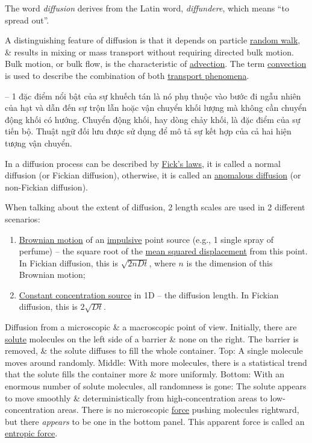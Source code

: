 \documentclass{article}
\begin{document}
The word {\it diffusion} derives from the Latin word, {\it diffundere}, which means ``to spread out''.

A distinguishing feature of diffusion is that it depends on particle \href{https://en.wikipedia.org/wiki/Random_walk}{random walk}, \& results in mixing or mass transport without requiring directed bulk motion. Bulk motion, or bulk flow, is the characteristic of \href{https://en.wikipedia.org/wiki/Advection}{advection}. The term \href{https://en.wikipedia.org/wiki/Convection}{convection} is used to describe the combination of both \href{https://en.wikipedia.org/wiki/Transport_phenomena}{transport phenomena}.

-- 1 đặc điểm nổi bật của sự khuếch tán là nó phụ thuộc vào bước đi ngẫu nhiên của hạt và dẫn đến sự trộn lẫn hoặc vận chuyển khối lượng mà không cần chuyển động khối có hướng. Chuyển động khối, hay dòng chảy khối, là đặc điểm của sự tiến bộ. Thuật ngữ đối lưu được sử dụng để mô tả sự kết hợp của cả hai hiện tượng vận chuyển.

In a diffusion process can be described by \href{https://en.wikipedia.org/wiki/Fick%27s_laws_of_diffusion}{Fick's laws}, it is called a normal diffusion (or Fickian diffusion), otherwise, it is called an \href{https://en.wikipedia.org/wiki/Anomalous_diffusion}{anomalous diffusion} (or non-Fickian diffusion).

When talking about the extent of diffusion, 2 length scales are used in 2 different scenarios:
\begin{enumerate}
	\item \href{https://en.wikipedia.org/wiki/Brownian_motion}{Brownian motion} of an \href{https://en.wikipedia.org/wiki/Impulse_response}{impulsive} point source (e.g., 1 single spray of perfume) -- the square root of the \href{https://en.wikipedia.org/wiki/Mean_squared_displacement}{mean squared displacement} from this point. In Fickian diffusion, this is $\sqrt{2nDt}$, where $n$ is the dimension of this Brownian motion;
	\item \href{https://en.wikipedia.org/wiki/Fick%27s_laws_of_diffusion#Example_solutions_and_generalization}{Constant concentration source} in 1D -- the diffusion length. In Fickian diffusion, this is $2\sqrt{Dt}$.
\end{enumerate}
{\sf Diffusion from a microscopic \& a macroscopic point of view. Initially, there are \href{https://en.wikipedia.org/wiki/Solute}{solute} molecules on the left side of a barrier \& none on the right. The barrier is removed, \& the solute diffuses to fill the whole container. Top: A single molecule moves around randomly. Middle: With more molecules, there is a statistical trend that the solute fills the container more \& more uniformly. Bottom: With an enormous number of solute molecules, all randomness is gone: The solute appears to move smoothly \& deterministically from high-concentration areas to low-concentration areas. There is no microscopic \href{https://en.wikipedia.org/wiki/Force}{force} pushing molecules rightward, but there {\it appears} to be one in the bottom panel. This apparent force is called an \href{https://en.wikipedia.org/wiki/Entropic_force}{entropic force}.}
\end{document}
